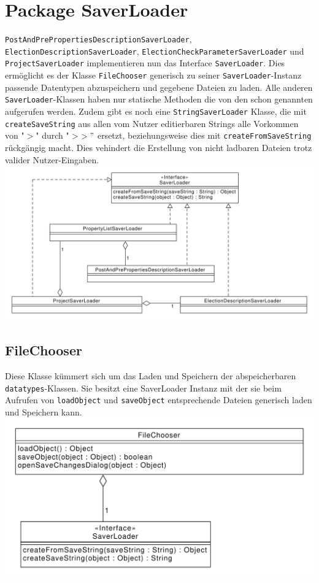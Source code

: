 \documentclass[a4paper]{scrreprt}
\begin{document}
\section{Package SaverLoader}
\verb!PostAndPrePropertiesDescriptionSaverLoader!, \verb!ElectionDescriptionSaverLoader!, \verb!ElectionCheckParameterSaverLoader! und \verb!ProjectSaverLoader! implementieren nun das Interface \verb!SaverLoader!. Dies ermöglicht es der Klasse \verb!FileChooser! generisch zu seiner \verb!SaverLoader!-Instanz passende Datentypen abzuspeichern und gegebene Dateien zu laden.
Alle anderen \verb!SaverLoader!-Klassen haben nur statische Methoden die von den schon genannten aufgerufen werden.
Zudem gibt es noch eine \verb!StringSaverLoader! Klasse, die mit \verb!createSaveString! aus allen vom Nutzer editierbaren Strings alle Vorkommen von "$>$" durch "$>$$>"$ ersetzt, beziehungsweise dies mit \verb!createFromSaveString! rückgängig macht. Dies vehindert die Erstellung von nicht ladbaren Dateien trotz valider Nutzer-Eingaben.\\
\includegraphics[scale=0.5]{SaverLoader.pdf}

\subsection{FileChooser}
Diese Klasse kümmert sich um das Laden und Speichern der abspeicherbaren \verb!datatypes!-Klassen. Sie besitzt eine SaverLoader Instanz mit der sie beim Aufrufen von \verb!loadObject! und \verb!saveObject! entsprechende Dateien generisch laden und Speichern kann.
\\
\includegraphics[scale=0.5]{FileChooser.pdf}
\end{document}
